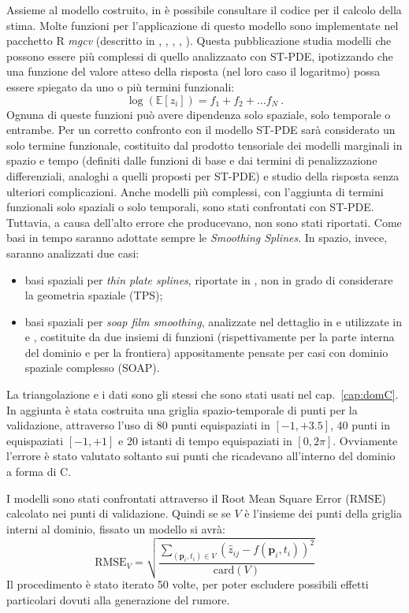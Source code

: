 \documentclass[a4paper,11pt,twoside,openright]{book}							%
\begin{document}
Assieme al modello costruito, in \cite{art:augustin} è possibile consultare il codice per il calcolo della stima. Molte funzioni per l'applicazione di questo modello sono implementate nel pacchetto R \textit{mgcv} (descritto in \cite{package:mgcv1}, \cite{package:mgcv2}, \cite{package:mgcv3}, \cite{package:mgcv4}, \cite{package:mgcv5}). Questa pubblicazione studia modelli che possono essere più complessi di quello analizzaato con ST-PDE, ipotizzando che una funzione del valore atteso della risposta (nel loro caso il logaritmo) possa essere spiegato da uno o più termini funzionali:
$$
\log(\mathbb{E}[z_i])= f_1+f_2+ \ldots f_N \ .
$$
Ognuna di queste funzioni può avere dipendenza solo spaziale, solo temporale o entrambe. Per un corretto confronto con il modello ST-PDE sarà considerato un solo termine funzionale, costituito dal prodotto tensoriale dei modelli marginali in spazio e tempo (definiti dalle funzioni di base e dai termini di penalizzazione differenziali, analoghi a quelli proposti per ST-PDE) e studio della risposta senza ulteriori complicazioni. Anche modelli più complessi, con l'aggiunta di termini funzionali solo spaziali o solo temporali, sono stati confrontati con ST-PDE. Tuttavia, a causa dell'alto errore che producevano, non sono stati riportati. Come basi in tempo saranno adottate sempre le \textit{Smoothing Splines}. In spazio, invece, saranno analizzati due casi:
\begin{itemize}
\item basi spaziali per \textit{thin plate splines}, riportate in \cite{package:mgcv4}, non in grado di considerare la geometria spaziale (TPS);
\item basi spaziali per \textit{soap film smoothing}, analizzate nel dettaglio in \cite{art:wood} e utilizzate in \cite{art:augustin} e \cite{art:marra}, costituite da due insiemi di funzioni (rispettivamente per la parte interna del dominio e per la frontiera) appositamente pensate per casi con dominio spaziale complesso (SOAP).
\end{itemize}

La triangolazione e i dati sono gli stessi che sono stati usati nel cap.~\ref{cap:domC}. In aggiunta è stata costruita una griglia spazio-temporale di punti per la validazione, attraverso l'uso di 80 punti equispaziati in $[-1,+3.5]$, 40 punti in equispaziati $[-1,+1]$ e 20 istanti di tempo equispaziati in $[0,2\pi]$. Ovviamente l'errore è stato valutato soltanto sui punti che ricadevano all'interno del dominio a forma di C.

I modelli sono stati confrontati attraverso il Root Mean Square Error ($\mathrm{RMSE}$) calcolato nei punti di validazione. Quindi se se $V$ è l'insieme dei punti della griglia interni al dominio, fissato un modello si avrà:
$$
\mathrm{RMSE}_V=\sqrt{\frac{\sum_{(\bm p_i,t_i)\in V} (\hat{z}_{ij}-f(\bm p_i,t_i))^2}{\mathrm{card}(V)}}
$$ 
Il procedimento è stato iterato 50 volte, per poter escludere possibili effetti particolari dovuti alla generazione del rumore.
\end{document}
